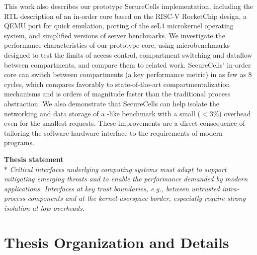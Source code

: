This work also describes our prototype SecureCells implementation, including
the RTL description of an in-order core based on the RISC-V RocketChip design,
a QEMU port for quick emulation, porting of the seL4 microkernel operating
system, and simplified versions of server benchmarks.
We investigate the performance characteristics of our prototype core, using
microbenchmarks designed to test the limits of access control, compartment 
switching and dataflow between compartments, and compare them to related work.
SecureCells' in-order core can switch between compartments (a key performance
metric) in as few as 8 cycles, which compares favorably to state-of-the-art
compartmentalization mechanisms and is orders of magnitude faster than the
traditional process abstraction.
We also demonstrate that SecureCells can help isolate the networking and
data storage of a -like benchmark with a small ($<3\%$)
overhead even for the smallest requests.
These improvements are a direct consequence of tailoring the software-hardware
interface to the requirements of modern programs.

\begin{center}
      \textbf{Thesis statement}\\*
\emph{
      Critical interfaces underlying computing systems must adapt 
      to support mitigating emerging threats and 
      to enable the performance demanded by modern applications.
      Interfaces at key trust boundaries, e.g.,
      between untrusted intra-process components and 
      at the kernel-userspace border, 
      especially require strong isolation at low overheads.
}
\end{center}


\section{Thesis Organization and Details}

